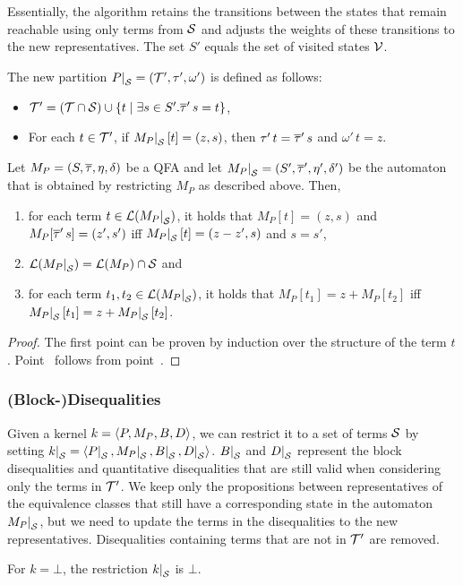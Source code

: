 Essentially, the algorithm retains the transitions between the states that remain reachable using only terms from $\mathcal{S}$ and adjusts the weights of these transitions to the new representatives.
The set $S'$ equals the set of visited states $\mathcal{V}$.

The new partition $\restr{P}{\Set} = (\T', \tau', \omega')$ is defined as follows:
\begin{itemize}
    \item $\mathcal{T}' = (\mathcal{T} \cap \mathcal{S}) \cup \{t \mid \exists s \in S' . \overline{\tau}'\,s = t\}$,
    \item For each $t \in \mathcal{T}'$, if $\restr{M_P}{\Set}[t] = (z, s)$, then $\tau'\,t = \overline{\tau}'\,s$ and $\omega'\,t = z$.
\end{itemize}

\begin{theorem}\label{restriction}
    Let $M_P = (S, \overline{\tau}, \eta, \delta)$ be a QFA and let $\restr{M_P}{\Set} = (S', \otau', \eta', \delta')$ be the automaton that is obtained by restricting $M_P$ as described above.
    Then,
    \begin{enumerate}
        \item\label{item:lemma-restriction} for each term $t \in \L(\restr{M_P}{\Set})$, it holds that $M_P[t] = (z, s)$ and $M_P[\overline{\tau}'\,s] = (z', s')$ iff $\restr{M_P}{\Set}[t] = (z - z', s)$ and $s = s'$,
        \item $\L(\restr{M_P}{\Set}) = \L(M_P) \cap \Set$ and
              \item\label{item:correctness-restriction} for each term $t_1, t_2 \in \L(\restr{M_P}{\Set})$, it holds that $M_P[t_1] = z + M_P[t_2]$ iff $\restr{M_P}{\Set}[t_1] = z + \restr{M_P}{\Set}[t_2]$.
    \end{enumerate}
\end{theorem}
\begin{proof}
    The first point can be proven by induction over the structure of the term $t$.
    Point~ follows from point~.
\end{proof}

\subsubsection{(Block-)Disequalities}
Given a kernel $k = \langle P, M_P, B, D\rangle$, we can restrict it to a set of terms $\mathcal{S}$ by setting $\restr{k}{\Set} = \angl{\restr{P}{\Set}, \restr{M_P}{\Set}, \restr{B}{\Set}, \restr{D}{\Set}}$.
$\restr{B}{\Set}$ and $\restr{D}{\Set}$ represent the block disequalities and quantitative disequalities that are still valid when considering only the terms in $\mathcal{T}'$.
We keep only the propositions between representatives of the equivalence classes that
still have a corresponding state in the automaton $\restr{M_P}{\Set}$, but we need to update the terms in the disequalities to the new representatives.
Disequalities containing terms that are not in $\mathcal{T}'$ are removed.

For $k = \bot$, the restriction $\restr{k}{\Set}$ is $\bot$.
